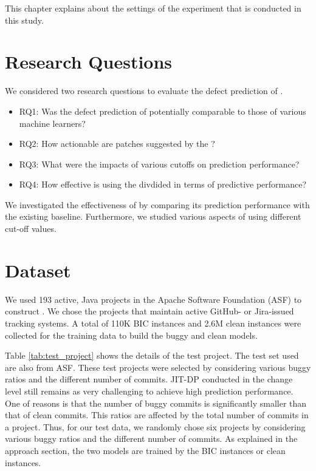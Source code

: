 This chapter explains about the settings of the experiment that is conducted in this study.

\section{Research Questions}
We considered two research questions to evaluate the defect prediction of {\simfinmo}.

\begin{itemize}
    \item RQ1: Was the defect prediction of {\simfinmo} potentially comparable to those of various machine learners?
    \item RQ2: How actionable are patches suggested by the {\simfinmo}?
    \item RQ3: What were the impacts of various {\simfinmo} cutoffs on prediction performance?
    \item RQ4: How effective is using the divdided {\simfin} in terms of predictive performance?
\end{itemize}

We investigated the effectiveness of {\simfinmo} by comparing its prediction performance with the existing baseline.
Furthermore, we studied various aspects of {\simfinmo} using different cut-off values.

\section{Dataset}
We used 193 active, Java projects in the Apache Software Foundation (ASF) to construct {\simfin}.
We chose the projects that maintain active GitHub- or Jira-issued tracking systems.
A total of 110K BIC instances and 2.6M clean instances were collected for the training data to build the buggy and clean {\simfin} models.

Table \ref{tab:test_project} shows the details of the test project.
The test set used are also from ASF.
These test projects were selected by considering various buggy ratios and the different number of commits.
JIT-DP conducted in the change level still remains as very challenging to achieve high prediction performance.
One of reasons is that the number of buggy commits is significantly smaller than that of clean commits.
This ratios are affected by the total number of commits in a project.
Thus, for our test data, we randomly chose six projects by considering various buggy ratios and the different number of commits.
As explained in the approach section, the two {\simfin} models are trained by the BIC instances or clean instances.

